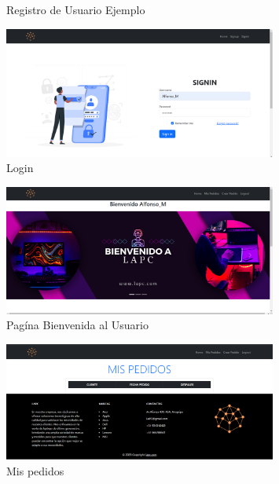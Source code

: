 \documentclass{article}
\begin{document}
\begin{itemize}
\begin{itemize}
\begin{figure}[H]
		      \caption{ Registro de Usuario Ejemplo}
	   \end{figure}
    \begin{figure}[H]
		      \centering
                \includegraphics[width=0.8\textwidth,keepaspectratio]{img/signin.png}
		      \caption{Login}
	   \end{figure}
  \begin{figure}[H]
		      \centering
                \includegraphics[width=0.8\textwidth,keepaspectratio]{img/hom1.png}
		      \caption{Pagína Bienvenida al Usuario}
	   \end{figure}
  \begin{figure}[H]
		      \centering
                \includegraphics[width=0.8\textwidth,keepaspectratio]{img/det3.png}
		      \caption{Mis pedidos}
	   \end{figure}

\end{itemize}
\end{itemize}
\end{document}
